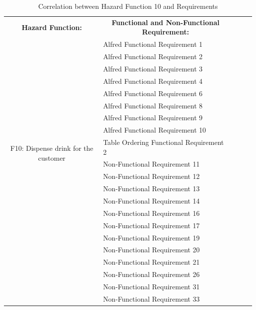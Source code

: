 \documentclass [10pt]{article}
\begin{document}


\begin{table}
\centering
\begin{tabular}{|c|l|lll}
\cline{1-2}
\textbf{Hazard Function:} & \multicolumn{1}{c|}{\textbf{Functional and Non-Functional Requirement:}} &  &  &  \\ \cline{1-2}
\multirow{18}{*}{F10: Dispense drink for the customer} 
				& Alfred Functional Requirement 1	&  &  &  \\ \cline{2-2}
                                  & Alfred Functional Requirement 2	&  &  &  \\ \cline{2-2}
                                  & Alfred Functional Requirement 3	&  &  &  \\ \cline{2-2}
                                  & Alfred Functional Requirement 4 	&  &  &  \\ \cline{2-2}
                                  & Alfred Functional Requirement 6	&  &  &  \\ \cline{2-2}
				& Alfred Functional Requirement 8	&  &  &  \\ \cline{2-2}
				& Alfred Functional Requirement 9	&  &  &  \\ \cline{2-2}
				& Alfred Functional Requirement 10	&  &  &  \\ \cline{2-2}
				& Table Ordering Functional Requirement 2	&  &  &  \\ \cline{2-2}
                                  & Non-Functional Requirement 11	&  &  &  \\ \cline{2-2}
                                  & Non-Functional Requirement 12	&  &  &  \\ \cline{2-2}
                                  & Non-Functional Requirement 13	&  &  &  \\ \cline{2-2}
                                  & Non-Functional Requirement 14	&  &  &  \\ \cline{2-2}
                                  & Non-Functional Requirement 16	&  &  &  \\ \cline{2-2}
                                  & Non-Functional Requirement 17	&  &  &  \\ \cline{2-2}
                                  & Non-Functional Requirement 19	&  &  &  \\ \cline{2-2}
                                  & Non-Functional Requirement 20	&  &  &  \\ \cline{2-2}
                                  & Non-Functional Requirement 21	&  &  &  \\ \cline{2-2}
                                  & Non-Functional Requirement 26	&  &  &  \\ \cline{2-2}
                                  & Non-Functional Requirement 31	&  &  &  \\ \cline{2-2}
                                  & Non-Functional Requirement 33	&  &  &  \\ \cline{1-2}
\end{tabular}
\caption{Correlation between Hazard Function 10 and Requirements}  
\end{table}
\end{document}
